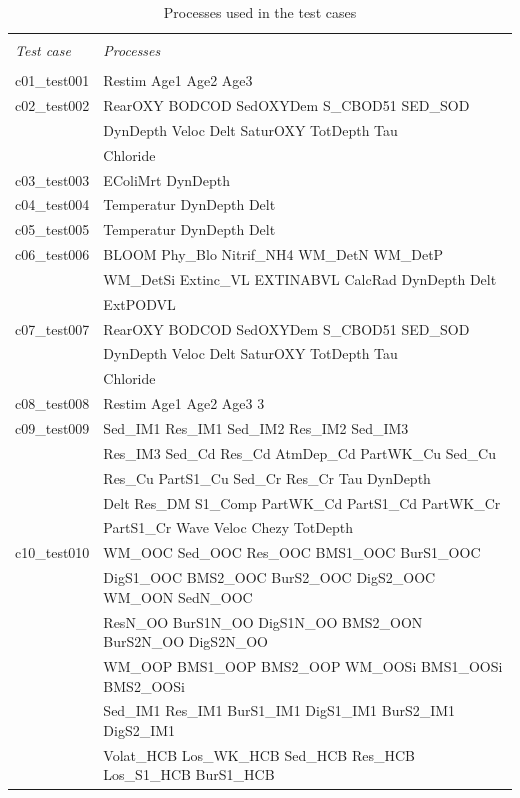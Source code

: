 
\begin{longtable}{ll}
\caption{Processes used in the test cases} \\
\hline \\
\emph{Test case} & \emph{Processes} \\
\hline \\
c01\_test001 & Restim Age1 Age2 Age3 \\
c02\_test002 & RearOXY BODCOD SedOXYDem S\_CBOD51 SED\_SOD \\ 
 & DynDepth Veloc Delt SaturOXY TotDepth Tau \\ 
 & Chloride \\
c03\_test003 & EColiMrt DynDepth \\
c04\_test004 & Temperatur DynDepth Delt \\
c05\_test005 & Temperatur DynDepth Delt \\
c06\_test006 & BLOOM Phy\_Blo Nitrif\_NH4 WM\_DetN WM\_DetP \\ 
 & WM\_DetSi Extinc\_VL EXTINABVL CalcRad DynDepth Delt \\ 
 & ExtPODVL \\
c07\_test007 & RearOXY BODCOD SedOXYDem S\_CBOD51 SED\_SOD \\ 
 & DynDepth Veloc Delt SaturOXY TotDepth Tau \\ 
 & Chloride \\
c08\_test008 & Restim Age1 Age2 Age3 3 \\
c09\_test009 & Sed\_IM1 Res\_IM1 Sed\_IM2 Res\_IM2 Sed\_IM3 \\ 
 & Res\_IM3 Sed\_Cd Res\_Cd AtmDep\_Cd PartWK\_Cu Sed\_Cu \\ 
 & Res\_Cu PartS1\_Cu Sed\_Cr Res\_Cr Tau DynDepth \\ 
 & Delt Res\_DM S1\_Comp PartWK\_Cd PartS1\_Cd PartWK\_Cr \\ 
 & PartS1\_Cr Wave Veloc Chezy TotDepth \\
c10\_test010 & WM\_OOC Sed\_OOC Res\_OOC BMS1\_OOC BurS1\_OOC \\ 
 & DigS1\_OOC BMS2\_OOC BurS2\_OOC DigS2\_OOC WM\_OON SedN\_OOC \\ 
 & ResN\_OO BurS1N\_OO DigS1N\_OO BMS2\_OON BurS2N\_OO DigS2N\_OO \\ 
 & WM\_OOP BMS1\_OOP BMS2\_OOP WM\_OOSi BMS1\_OOSi BMS2\_OOSi \\ 
 & Sed\_IM1 Res\_IM1 BurS1\_IM1 DigS1\_IM1 BurS2\_IM1 DigS2\_IM1 \\ 
 & Volat\_HCB Los\_WK\_HCB Sed\_HCB Res\_HCB Los\_S1\_HCB BurS1\_HCB \\ 

\end{longtable}
